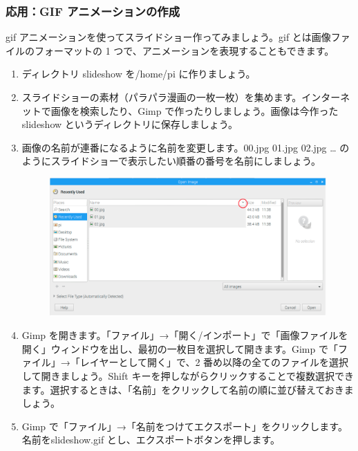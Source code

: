 \subsubsection{応用：GIF アニメーションの作成}
\label{GIF}
gif アニメーションを使ってスライドショー作ってみましょう。gif とは画像ファイルのフォーマットの 1 つで、アニメーションを表現することもできます。\\
\begin{enumerate}
\item ディレクトリ slideshow を/home/pi に作りましょう。\\
\item スライドショーの素材（パラパラ漫画の一枚一枚）を集めます。インターネットで画像を検索したり、Gimp で作ったりしましょう。画像は今作った slideshow というディレクトリに保存しましょう。\\
\item 画像の名前が連番になるように名前を変更します。00.jpg 01.jpg 02.jpg … のようにスライドショーで表示したい順番の番号を名前にしましょう。\\
\begin{figure}[H]
    \centering
    \includegraphics[width=\linewidth]{images/chap03/text03-img025.png}
\end{figure}
\item Gimp を開きます。「ファイル」→「開く/インポート」で「画像ファイルを開く」ウィンドウを出し、最初の一枚目を選択して開きます。Gimp で「ファイル」→「レイヤーとして開く」で、2 番め以降の全てのファイルを選択して開きましょう。Shift キーを押しながらクリックすることで複数選択できます。選択するときは、「名前」をクリックして名前の順に並び替えておきましょう。\\
\item Gimp で「ファイル」→「名前をつけてエクスポート」をクリックします。名前をslideshow.gif とし、エクスポートボタンを押します。
\begin{figure}[H]

\end{figure}
\end{enumerate}
